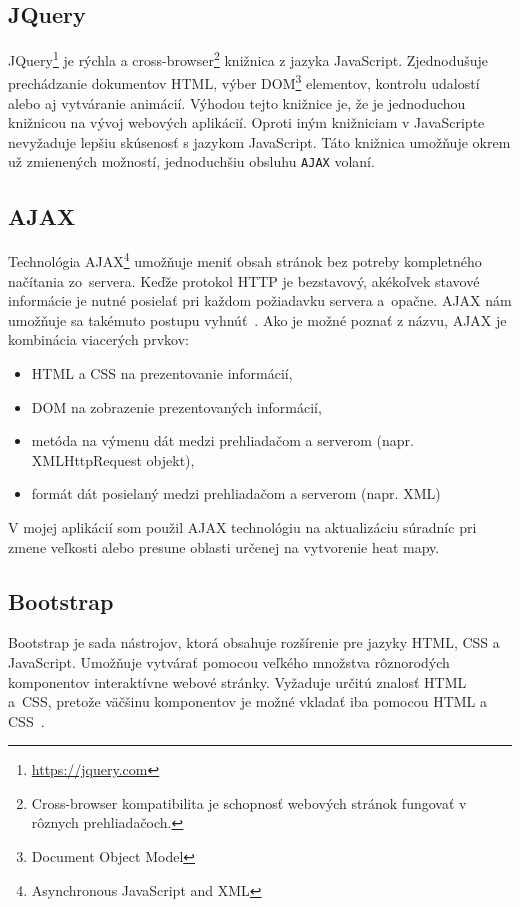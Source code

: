 \subsection{JQuery}
JQuery\footnote{\url{https://jquery.com}} je rýchla a cross-browser\footnote{Cross-browser kompatibilita je schopnosť webových stránok fungovať v rôznych prehliadačoch.} knižnica z jazyka JavaScript. Zjednodušuje prechádzanie dokumentov HTML, výber DOM\footnote{Document Object Model} elementov, kontrolu udalostí alebo aj vytváranie animácií. Výhodou tejto knižnice je, že je jednoduchou knižnicou na vývoj webových aplikácií. Oproti iným knižniciam v JavaScripte nevyžaduje lepšiu skúsenosť s jazykom JavaScript. Táto knižnica umožňuje okrem už zmienených možností, jednoduchšiu obsluhu \texttt{AJAX} volaní.

\subsection{AJAX}
Technológia AJAX\footnote{Asynchronous JavaScript and XML} umožňuje meniť obsah stránok bez potreby kompletného načítania zo~servera. Keďže protokol HTTP je bezstavový, akékoľvek stavové informácie je nutné posielať pri každom požiadavku servera a~opačne. AJAX nám umožňuje sa takémuto postupu vyhnúť~\cite{lacko2008ajax}. Ako je možné poznať z názvu, AJAX je kombinácia viacerých prvkov:
\begin{itemize}
    \item HTML a CSS na prezentovanie informácií,
    \item DOM na zobrazenie prezentovaných informácií,
    \item metóda na výmenu dát medzi prehliadačom a serverom (napr. XMLHttpRequest objekt),
    \item formát dát posielaný medzi prehliadačom a serverom (napr. XML)
\end{itemize}

V mojej aplikácií som použil AJAX technológiu na aktualizáciu súradníc pri zmene veľkosti alebo presune oblasti určenej na vytvorenie heat mapy.

\subsection{Bootstrap}
Bootstrap je sada nástrojov, ktorá obsahuje rozšírenie pre jazyky HTML, CSS a JavaScript. Umožňuje vytvárať pomocou veľkého množstva rôznorodých komponentov interaktívne webové stránky. Vyžaduje určitú znalosť HTML a~CSS, pretože väčšinu komponentov je možné vkladať iba pomocou HTML a CSS~\cite{bootstrap}.

